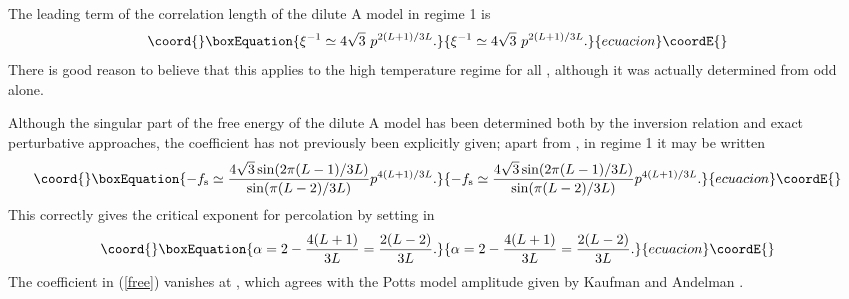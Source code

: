 \documentclass[a4paper,a4paper]{article}
\begin{document}
The leading term of the correlation length \cite{BS, BS2} of the dilute A\coordHE{}
model in regime 1 is
\begin{equation*}\coord{}\boxEquation{
\xi^{-1}\simeq 4 \sqrt{3}\  p^{2(L+1)/3L}. 
}{
\xi^{-1}\simeq 4 \sqrt{3}\  p^{2(L+1)/3L}. 
}{ecuacion}\coordE{}\end{equation*}
There is good reason to believe that this 
applies to the high temperature regime for all \coordHE{}, although it
was actually determined from \coordHE{} odd alone.
%

Although the singular part of the free energy of the dilute A model has
been determined both by the inversion relation \cite{WPSN}
and exact perturbative \cite{BS,BS2} approaches, the coefficient
has not previously been explicitly given; apart from \coordHE{}, in regime 1
it may be written
\begin{equation}\coord{}\boxEquation{
-f_{\rm s}\simeq\frac{4 \sqrt{3} \sin(2 \pi(L-1)/3L)}{\sin(\pi(L-2)/3L)}
p^{4(L+1)/3L}.
\label{free}
}{
-f_{\rm s}\simeq\frac{4 \sqrt{3} \sin(2 \pi(L-1)/3L)}{\sin(\pi(L-2)/3L)}
p^{4(L+1)/3L}.
}{ecuacion}\coordE{}\end{equation}
This correctly gives the critical exponent \coordHE{} for percolation
by setting \coordHE{} in
\begin{equation*}\coord{}\boxEquation{
\alpha= 2-\frac{4(L+1)}{3L}=\frac{2(L-2)}{3L}. \label{alf}
}{
\alpha= 2-\frac{4(L+1)}{3L}=\frac{2(L-2)}{3L}. }{ecuacion}\coordE{}\end{equation*}
The coefficient in (\ref{free}) vanishes at \coordHE{}, which agrees
with the \coordHE{} Potts model amplitude given by Kaufman and Andelman \cite{KA}.
 
\end{document}

